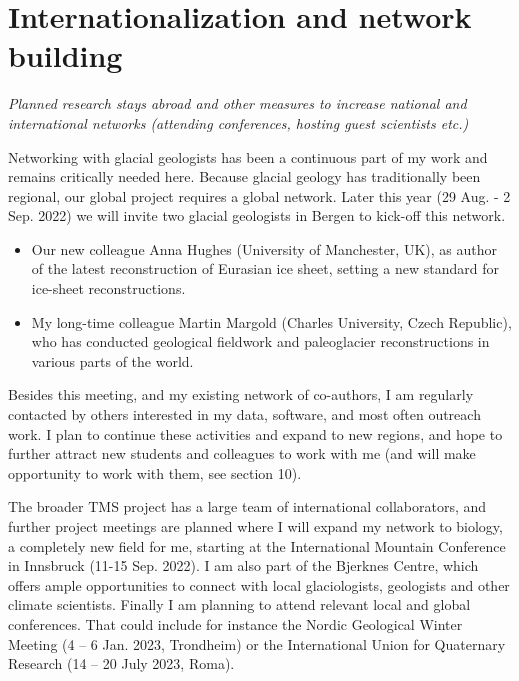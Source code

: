 \documentclass{article}
\newcommand{\guideline}[1]{{\color{color2}\itshape{#1}}}
\begin{document}
\section{Internationalization and network building}

\guideline{
    Planned research stays abroad and other measures to increase national and
    international networks (attending conferences, hosting guest scientists
    etc.)}

    Networking with glacial geologists has been a continuous part of my work
    and remains critically needed here. Because glacial geology has
    traditionally been regional, our global project requires a global network.
    Later this year (29 Aug. - 2 Sep. 2022) we will invite two glacial
    geologists in Bergen to kick-off this network.

    \begin{itemize}
      \item Our new colleague Anna Hughes (University of Manchester, UK), as
        author of the latest reconstruction of Eurasian ice sheet, setting a
        new standard for ice-sheet reconstructions.
      \item My long-time colleague Martin Margold (Charles University, Czech
        Republic), who has conducted geological fieldwork and paleoglacier
        reconstructions in various parts of the world.
    \end{itemize}

    Besides this meeting, and my existing network of co-authors, I am regularly
    contacted by others interested in my data, software, and most often
    outreach work. I plan to continue these activities and expand to new
    regions, and hope to further attract new students and colleagues to work
    with me (and will make opportunity to work with them, see section 10).

    The broader TMS project has a large team of international collaborators,
    and further project meetings are planned where I will expand my network to
    biology, a completely new field for me, starting at the International
    Mountain Conference in Innsbruck (11-15 Sep. 2022). I am also part of the
    Bjerknes Centre, which offers ample opportunities to connect with local
    glaciologists, geologists and other climate scientists. Finally I am
    planning to attend relevant local and global conferences. That could
    include for instance the Nordic Geological Winter Meeting (4 – 6 Jan. 2023,
    Trondheim) or the International Union for Quaternary Research (14 – 20 July
    2023, Roma).
\end{document}
